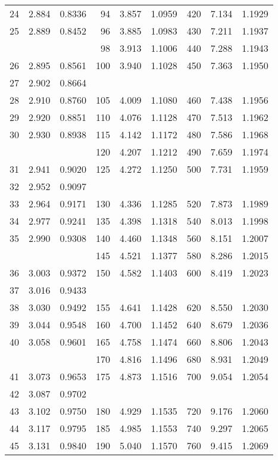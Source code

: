 \documentclass[draft]{article}
\begin{document}
\begin{table}
\begin{center}
\begin{tabular}{rllrllrll}
24 & 2.884 & 0.8336 & 94 & 3.857 & 1.0959 & 420 & 7.134 & 1.1929 \\
25 & 2.889 & 0.8452 & 96 & 3.885 & 1.0983 & 430 & 7.211 & 1.1937 \\
   &       &        & 98 & 3.913 & 1.1006 & 440 & 7.288 & 1.1943 \\
26 & 2.895 & 0.8561 & 100 & 3.940 & 1.1028 & 450 & 7.363 & 1.1950 \\
27 & 2.902 & 0.8664 \\
28 & 2.910 & 0.8760 & 105 & 4.009 & 1.1080 & 460 & 7.438 & 1.1956 \\
29 & 2.920 & 0.8851 & 110 & 4.076 & 1.1128 & 470 & 7.513 & 1.1962 \\
30 & 2.930 & 0.8938 & 115 & 4.142 & 1.1172 & 480 & 7.586 & 1.1968 \\
   &       &        & 120 & 4.207 & 1.1212 & 490 & 7.659 & 1.1974 \\
31 & 2.941 & 0.9020 & 125 & 4.272 & 1.1250 & 500 & 7.731 & 1.1959 \\
32 & 2.952 & 0.9097 \\
33 & 2.964 & 0.9171 & 130 & 4.336 & 1.1285 & 520 & 7.873 & 1.1989 \\
34 & 2.977 & 0.9241 & 135 & 4.398 & 1.1318 & 540 & 8.013 & 1.1998 \\
35 & 2.990 & 0.9308 & 140 & 4.460 & 1.1348 & 560 & 8.151 & 1.2007 \\
   &       &        & 145 & 4.521 & 1.1377 & 580 & 8.286 & 1.2015 \\
36 & 3.003 & 0.9372 & 150 & 4.582 & 1.1403 & 600 & 8.419 & 1.2023 \\
37 & 3.016 & 0.9433 \\
38 & 3.030 & 0.9492 & 155 & 4.641 & 1.1428 & 620 & 8.550 & 1.2030 \\
39 & 3.044 & 0.9548 & 160 & 4.700 & 1.1452 & 640 & 8.679 & 1.2036 \\
40 & 3.058 & 0.9601 & 165 & 4.758 & 1.1474 & 660 & 8.806 & 1.2043 \\
   &       &        & 170 & 4.816 & 1.1496 & 680 & 8.931 & 1.2049 \\
41 & 3.073 & 0.9653 & 175 & 4.873 & 1.1516 & 700 & 9.054 & 1.2054 \\
42 & 3.087 & 0.9702 \\
43 & 3.102 & 0.9750 & 180 & 4.929 & 1.1535 & 720 & 9.176 & 1.2060 \\
44 & 3.117 & 0.9795 & 185 & 4.985 & 1.1553 & 740 & 9.297 & 1.2065 \\
45 & 3.131 & 0.9840 & 190 & 5.040 & 1.1570 & 760 & 9.415 & 1.2069 \\

\end{tabular}
\end{center}
\end{table}
\end{document}
